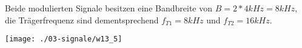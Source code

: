 Beide modulierten Signale besitzen eine Bandbreite von $B=2*4kHz=8kHz$, die Trägerfrequenz sind dementsprechend $f_{T1}=8kHz$ und $f_{T2}=16kHz$.
\begin{center}
    \vspace{-8pt}
    \texttt{[image: ./03-signale/w13\_5]}
    \vspace{-8pt}
\end{center}
